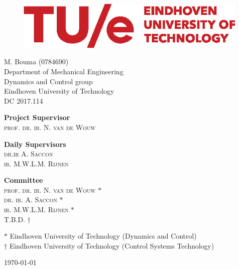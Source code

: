 \documentclass[DC2017114Bouma.tex]{subfiles}
\begin{document}
\begin{figure}[H]
\centering
\begin{minipage}{.7\textwidth}
  \includegraphics[width=1\linewidth]{TUe-logo-descriptor-line-scarlet-rgb.eps}
\end{minipage}
\end{figure}  

\begin{center}

\vspace*{20pt}
\huge{\textbf{\mytitle}}

\vspace*{30pt}
{\Large M. Bouma (0784690)}\\
\large{Department of Mechanical Engineering\\
			Dynamics and Control group\\
			Eindhoven University of Technology}\\
{\large DC 2017.114}

\end{center}

\vspace{3cm}

\begin{flushleft} 
	\textbf{Project Supervisor}\\
	\textsc{prof. dr. ir. N. van de Wouw}
\end{flushleft}
\vspace{.1cm}
\begin{flushleft} 
	\textbf{Daily Supervisors}\\
	\textsc{dr.ir A. Saccon}\\
	\textsc{ir. M.W.L.M. Rijnen}
\end{flushleft}
\vspace{.1cm}
\begin{flushleft} 
	\textbf{Committee}\\
	\textsc{prof. dr. ir. N. van de Wouw} $*$\\
	\textsc{dr. ir. A. Saccon} $*$\\
	\textsc{ir. M.W.L.M. Rijnen} $*$\\
	\textsc{T.B.D.} $\dagger$
\end{flushleft}
\vfill
{\small $*$ Eindhoven University of Technology (Dynamics and Control)}\\
{\small $\dagger$ Eindhoven University of Technology (Control Systems Technology)}
\bigskip

\today
\end{document}
